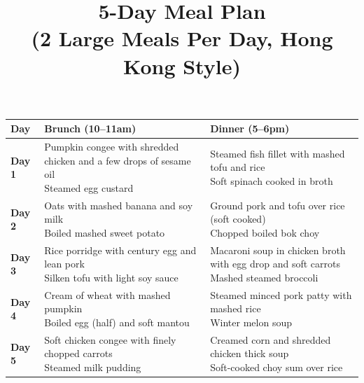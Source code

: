 \documentclass[12pt]{article}
\title{\textbf{5-Day Meal Plan}\\\large (2 Large Meals Per Day, Hong
Kong Style)}
\date{}
\begin{document}
\maketitle
\vspace{-1em}

\onehalfspacing
\renewcommand{\arraystretch}{1.8}
\setlength{\tabcolsep}{8pt}

\setlength\LTleft{\fill}
\setlength\LTright{\fill}
\begin{longtable}{|p{2.0cm}|p{6.0cm}|p{6.0cm}|}
  \hline
  \textbf{Day} & \textbf{Brunch (10--11am)} & \textbf{Dinner (5--6pm)} \\
  \hline
  \textbf{Day 1} &
  {\raggedright Pumpkin congee with shredded chicken and a few drops
    of sesame oil\\
  Steamed egg custard} &
  {\raggedright Steamed fish fillet with mashed tofu and rice\\
  Soft spinach cooked in broth} \\
  \hline
  \textbf{Day 2} &
  {\raggedright Oats with mashed banana and soy milk\\
  Boiled mashed sweet potato} &
  {\raggedright Ground pork and tofu over rice (soft cooked)\\
  Chopped boiled bok choy} \\
  \hline
  \textbf{Day 3} &
  {\raggedright Rice porridge with century egg and lean pork\\
  Silken tofu with light soy sauce} &
  {\raggedright Macaroni soup in chicken broth with egg drop and soft carrots\\
  Mashed steamed broccoli} \\
  \hline
  \textbf{Day 4} &
  {\raggedright Cream of wheat with mashed pumpkin\\
  Boiled egg (half) and soft mantou} &
  {\raggedright Steamed minced pork patty with mashed rice\\
  Winter melon soup} \\
  \hline
  \textbf{Day 5} &
  {\raggedright Soft chicken congee with finely chopped carrots\\
  Steamed milk pudding} &
  {\raggedright Creamed corn and shredded chicken thick soup\\
  Soft-cooked choy sum over rice} \\
\hline
\end{longtable}
\end{document}
